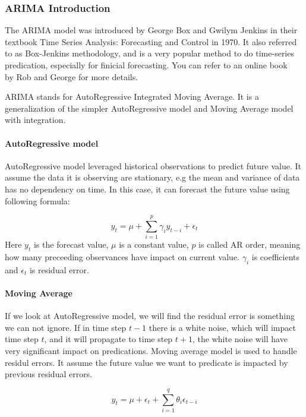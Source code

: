\documentclass[10pt,twocolumn,letterpaper]{article}
\begin{document}
\subsubsection{ARIMA Introduction}

The ARIMA model was introduced by George Box and Gwilym Jenkins in their textbook Time Series Analysis: Forecasting and Control in 1970. It also referred to as Box-Jenkins methodology, and is a very popular method to do time-series predication, especially for finicial forecasting. You can refer to an online book ~\cite{Authors07} by Rob and George for more details.

ARIMA stands for AutoRegressive Integrated Moving Average. It is a generalization of the simpler AutoRegressive model and Moving Average model with integration.

\paragraph{AutoRegressive model}
\par
AutoRegressive model leveraged historical observations to predict future value. It assume the data it is observing are stationary, e.g the mean and variance of data has no dependency on time. In this case, it can forecast the future value using following formula:
\par
\begin{equation*}
y_t = \mu + \sum_{i=1}^{p}\gamma_iy_{t-i} + \epsilon_t{}
\end{equation*}
Here $y_t$ is the forecast value, $\mu$ is a constant value, $p$ is called AR order, meaning how many preceeding observances have impact on current value. $\gamma_i$ is  coefficients and $\epsilon_t$ is residual error.

\paragraph{Moving Average}
\par
If we look at AutoRegressive model, we will find the residual error is something we can not ignore. If in time step $t - 1$ there is a white noise, which will impact time step $t$, and it will propagate to time step $t + 1$, the white noise will have very significant impact on predications. Moving average model is used to handle residul errors. It assume the future value we want to predicate is impacted by previous residual errors. 

\par
\begin{equation*}
y_t = \mu + \epsilon_t + \sum_{i=1}^{q}\theta_i\epsilon_{t-i} 
\end{equation*}
\end{document}
